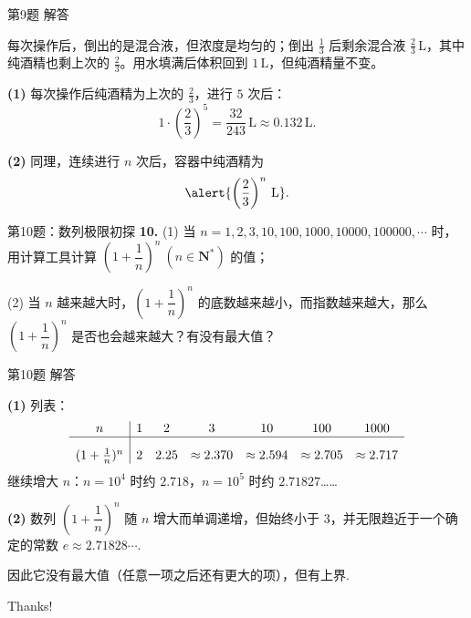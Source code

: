 \documentclass[10pt,aspectratio=169,serif,fleqn]{beamer}
\begin{document}
\begin{frame}[t]{第9题 解答}\vspace{-1.5em}
\begin{tcolorbox}[colback=orange!10,colframe=orange,title=\textbf{解}]
每次操作后，倒出的是混合液，但浓度是均匀的；倒出 $\frac13$ 后剩余混合液 $\frac23\,\text{L}$，其中纯酒精也剩上次的 $\frac23$。用水填满后体积回到 $1\,\text{L}$，但纯酒精量不变。

\vspace{0.4em}
\textbf{(1)} 每次操作后纯酒精为上次的 $\frac{2}{3}$，进行 $5$ 次后：
\[
1\cdot\left(\frac{2}{3}\right)^{5}=\frac{32}{243}\,\text{L}\approx 0.132\,\text{L}.
\]

\vspace{0.6em}
\textbf{(2)} 同理，连续进行 $n$ 次后，容器中纯酒精为
\[
\alert{\left(\frac{2}{3}\right)^{n}\,\text{L}}.
\]
\end{tcolorbox}
\end{frame}

\begin{frame}[t]{第10题：数列极限初探}
\textbf{10.}
(1) 当 $n=1,2,3,10,100,1000,10000,100000,\cdots$ 时，用计算工具计算 $\left(1+\dfrac{1}{n}\right)^{n}\ (n\in\mathbf{N}^{*})$ 的值；

(2) 当 $n$ 越来越大时，$\left(1+\dfrac{1}{n}\right)^{n}$ 的底数越来越小，而指数越来越大，那么 $\left(1+\dfrac{1}{n}\right)^{n}$ 是否也会越来越大？有没有最大值？
\end{frame}

\begin{frame}[t]{第10题 解答}\vspace{-1.5em}
\begin{tcolorbox}[colback=orange!10,colframe=orange,title=\textbf{解}]
\textbf{(1)} 列表：
\[
\begin{array}{c|cccccc}
n & 1 & 2 & 3 & 10 & 100 & 1000\\ \hline
(1+\frac1n)^{n}\rule[12pt]{0pt}{5pt} & 2 & 2.25 & \approx 2.370 & \approx 2.594 & \approx 2.705 & \approx 2.717
\end{array}
\]
继续增大 $n$：$n=10^{4}$ 时约 $2.718$，$n=10^{5}$ 时约 $2.71827$……

\vspace{0.6em}
\textbf{(2)} 数列 $\left(1+\dfrac{1}{n}\right)^{n}$ 随 $n$ 增大而\alert{单调递增}，但始终小于 $3$，并无限趋近于一个确定的常数
$e\approx 2.71828\cdots.$\rule[15pt]{0pt}{0pt}\rule[-10pt]{0pt}{0pt}

因此它没有最大值（任意一项之后还有更大的项），但有上界.%
\end{tcolorbox}
\end{frame}

\begin{frame}[c]
  \begin{center}
    {\Huge\calligra Thanks!}
  \end{center}
\end{frame}
\end{document}
